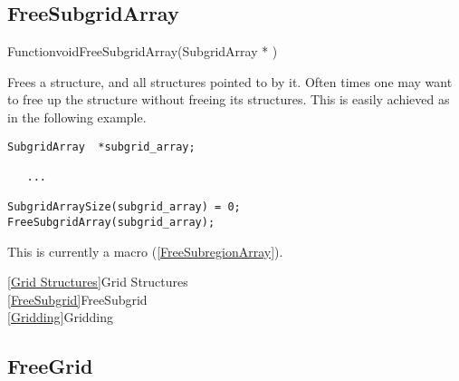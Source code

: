 
\newpage
\subsection{FreeSubgridArray}
\label{FreeSubgridArray}


\begin{deftypefn}{Function}{void}{FreeSubgridArray}({SubgridArray *} )

\DESCRIPTION
Frees a  structure, and all 
structures pointed to by it.
Often times one may want to free up the  structure
without freeing its  structures.
This is easily achieved as in the following example.

\EXAMPLE
\mbox{}
\begin{display}\begin{verbatim}
SubgridArray  *subgrid_array;

   ...

SubgridArraySize(subgrid_array) = 0;
FreeSubgridArray(subgrid_array);
\end{verbatim}\end{display}

\NOTES
This is currently a macro (\ref{FreeSubregionArray}).

\SEEALSO
\vref{Grid Structures}{Grid Structures}\\
\vref{FreeSubgrid}{FreeSubgrid}\\
\vref{Gridding}{Gridding}

\end{deftypefn}


\newpage
\subsection{FreeGrid}
\label{FreeGrid}


